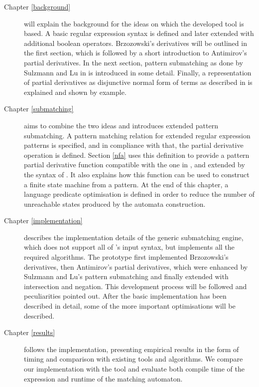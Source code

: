\begin{description}

   \item[Chapter \ref{background}] will explain the background for the ideas on
      which the developed tool is based. A basic regular expression syntax is
      defined and later extended with additional boolean operators. Brzozowski's
      derivatives will be outlined in the first section, which is followed by a
      short introduction to Antimirov's partial derivatives. In the next
      section, pattern submatching as done by Sulzmann and Lu in \cite{pdpat} is
      introduced in some detail. Finally, a representation of partial
      derivatives as disjunctive normal form of terms as described in
      \cite{pdere} is explained and shown by example.

   \item[Chapter \ref{submatching}] aims to combine the two ideas and introduces
      extended pattern submatching. A pattern matching relation for extended
      regular expression patterns is specified, and in compliance with that, the
      partial derivative operation is defined. Section \ref{nfa} uses this
      definition to provide a pattern partial derivative function compatible
      with the one in \cite{pdpat}, and extended by the syntax of \cite{pdere}.
      It also explains how this function can be used to construct a finite state
      machine from a pattern. At the end of this chapter, a language predicate
      optimisation is defined in order to reduce the number of unreachable
      states produced by the automata construction.

   \item[Chapter \ref{implementation}] describes the implementation details of
      the generic submatching engine, which does not support all of \dreml's
      input syntax, but implements all the required algorithms. The prototype
      first implemented Brzozowski's derivatives, then Antimirov's partial
      derivatives, which were enhanced by Sulzmann and Lu's pattern submatching
      and finally extended with intersection and negation. This development
      process will be followed and peculiarities pointed out. After the basic
      implementation has been described in detail, some of the more important
      optimisations will be described.

   \needspace{2cm}
   \item[Chapter \ref{results}] follows the implementation, presenting empirical
      results in the form of timing and comparison with existing tools and
      algorithms. We compare our implementation with the \mlulex{} tool and
      evaluate both compile time of the expression and runtime of the matching
      automaton.


\end{description}
